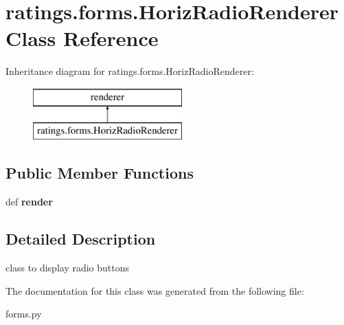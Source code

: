 \hypertarget{classratings_1_1forms_1_1HorizRadioRenderer}{\section{ratings.\-forms.\-Horiz\-Radio\-Renderer Class Reference}
\label{classratings_1_1forms_1_1HorizRadioRenderer}
}
Inheritance diagram for ratings.\-forms.\-Horiz\-Radio\-Renderer\-:\begin{figure}[H]
\begin{center}
\leavevmode
\includegraphics[height=2.000000cm]{classratings_1_1forms_1_1HorizRadioRenderer}
\end{center}
\end{figure}
\subsection*{Public Member Functions}
\begin{DoxyCompactItemize}
\item 
\hypertarget{classratings_1_1forms_1_1HorizRadioRenderer_a90b7fcd9d823c2c87b337a27c23b9326}{def {\bfseries render}}\label{classratings_1_1forms_1_1HorizRadioRenderer_a90b7fcd9d823c2c87b337a27c23b9326}

\end{DoxyCompactItemize}


\subsection{Detailed Description}
\begin{DoxyVerb}class to display radio buttons
\end{DoxyVerb}
 

The documentation for this class was generated from the following file\-:\begin{DoxyCompactItemize}
\item 
forms.\-py\end{DoxyCompactItemize}
